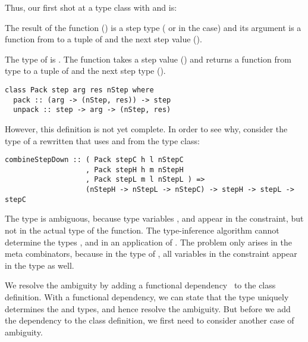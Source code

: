 \documentclass[preprint,natbib]{sigplanconf}
\begin{document}
Thus, our first shot at a type class with  and  is:

\bc The result of the function () is a step type ( or  in the  case) and its argument is a function from  to a tuple of  and the next step value ().  


 The type of  is . The function takes a step value () and returns a function from type  to a tuple of  and the next step type (). 
\ec


\begin{small}
\begin{verbatim}
class Pack step arg res nStep where
  pack :: (arg -> (nStep, res)) -> step
  unpack :: step -> arg -> (nStep, res)
\end{verbatim}
\end{small}

However, this definition is not yet complete. In order to see why, consider the type of a rewritten  that uses  and  from the type class:

\begin{small}
\begin{verbatim}
combineStepDown :: ( Pack stepC h l nStepC 
                   , Pack stepH h m nStepH
                   , Pack stepL m l nStepL ) => 
                   (nStepH -> nStepL -> nStepC) -> stepH -> stepL -> stepC
\end{verbatim}
\end{small}

The type is ambiguous, because type variables ,  and  appear in the constraint, but not in the actual type of the function. The type-inference algorithm cannot determine the types ,  and  in an application of . The problem only arises in the  meta combinators, because in the type of , all variables in the constraint appear in the type as well.

We resolve the ambiguity by adding a functional dependency~\cite{jones00fundep} to the class definition. With a functional dependency, we can state  that  the  type uniquely determines the  and  types, and hence resolve the ambiguity. But before we add the dependency to the class definition, we first need to consider another case of ambiguity.
\end{document}
